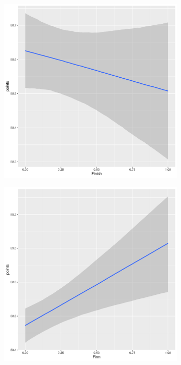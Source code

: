 \documentclass{article}
\begin{document}
\begin{figure}[htbp]
	\begin{subfigure}{0.22\textwidth}
		\includegraphics[width=\textwidth]{imgs/Rplots-15.pdf}
	\end{subfigure}\hfill
	\begin{subfigure}{0.22\textwidth}
		\includegraphics[width=\textwidth]{imgs/Rplots-16.pdf}

\end{subfigure}
\end{figure}
\end{document}
